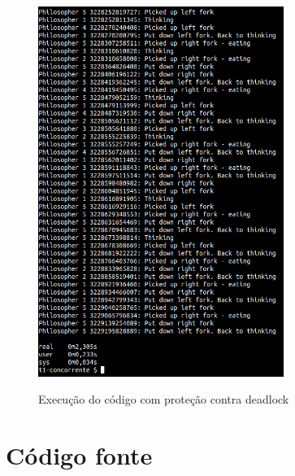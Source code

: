 \documentclass[conference]{IEEEtran}
\begin{document}
\begin{figure}[h!]
\caption{Execução do código com proteção contra deadlock}
\centering
\includegraphics[width=8cm]{dea}
\label{fig:deadlock}
\end{figure}


\section{Código fonte}








\end{document}
